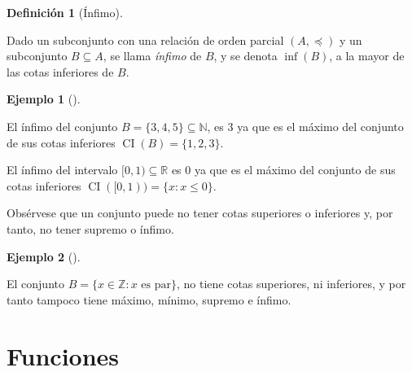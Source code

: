 \documentclass[
  a4paper,
]{scrreport}
\theoremstyle{plain}
\theoremstyle{plain}
\theoremstyle{definition}
\newtheorem{definition}{Definición}[chapter]
\theoremstyle{definition}
\newtheorem{example}{Ejemplo}[chapter]
\theoremstyle{plain}
\theoremstyle{remark}
\begin{document}
\begin{definition}[Ínfimo]\protect\hypertarget{def-infimo-conjunto}{}\label{def-infimo-conjunto}

Dado un subconjunto con una relación de orden parcial \((A,\preceq)\) y
un subconjunto \(B\subseteq A\), se llama \emph{ínfimo} de \(B\), y se
denota \(\inf(B)\), a la mayor de las cotas inferiores de \(B\).

\end{definition}

\begin{example}[]\protect\hypertarget{exm-infimo}{}\label{exm-infimo}

El ínfimo del conjunto \(B=\{3, 4, 5\}\subseteq \mathbb{N}\), es \(3\)
ya que es el máximo del conjunto de sus cotas inferiores
\(\operatorname{CI}(B)=\{1, 2, 3\}\).

El ínfimo del intervalo \([0,1)\subseteq \mathbb{R}\) es \(0\) ya que es
el máximo del conjunto de sus cotas inferiores
\(\operatorname{CI}([0,1)) = \{x:x\leq 0\}\).

\end{example}

\begin{tcolorbox}[enhanced jigsaw, colback=white, bottomtitle=1mm, breakable, coltitle=black, opacitybacktitle=0.6, colframe=quarto-callout-warning-color-frame, titlerule=0mm, toptitle=1mm, leftrule=.75mm, opacityback=0, rightrule=.15mm, title=\textcolor{quarto-callout-warning-color}{\faExclamationTriangle}\hspace{0.5em}{Advertencia}, arc=.35mm, bottomrule=.15mm, colbacktitle=quarto-callout-warning-color!10!white, toprule=.15mm, left=2mm]

Obsérvese que un conjunto puede no tener cotas superiores o inferiores
y, por tanto, no tener supremo o ínfimo.

\end{tcolorbox}

\begin{example}[]\protect\hypertarget{exm-no-supremo-infimio}{}\label{exm-no-supremo-infimio}

El conjunto \(B=\{x\in\mathbb{Z}: x \mbox{ es par}\}\), no tiene cotas
superiores, ni inferiores, y por tanto tampoco tiene máximo, mínimo,
supremo e ínfimo.

\end{example}

\hypertarget{funciones}{%
\section{Funciones}\label{funciones}}
\end{document}
